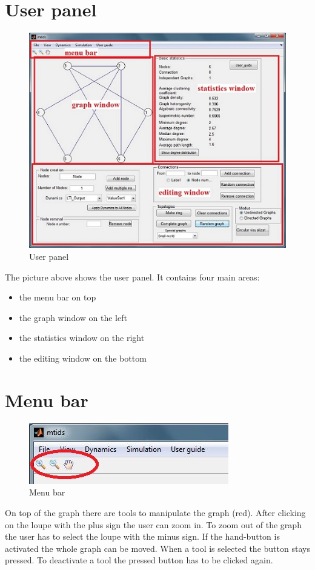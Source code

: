\documentclass[12pt]{report}
\begin{document}
\section{User panel}
\begin{figure}
\centering
\includegraphics[scale=.6]{user_panela3}
\caption{User panel}
\label{FIG:abb6}
\end{figure}
The picture above shows the user panel. It contains four main areas:\\
\begin{itemize}
	\item the menu bar on top
	\item the graph window on the left
	\item the statistics window on the right
	\item the editing window on the bottom
\end{itemize}
\section{Menu bar}
\label{sec:menubar}
\begin{figure}[h]
\centering
\includegraphics[scale=.8]{toolsa}
\caption{Menu bar}
\label{FIG:abb7}
\end{figure}
\noindent On top of the graph there are tools to manipulate the graph (red). After clicking on the loupe with the plus sign the user can zoom in. To zoom out of the graph the user has to select the loupe with the minus sign. If the hand-button is activated the whole graph can be moved. When a tool is selected the button stays pressed. To deactivate a tool the pressed button has to be clicked again.\\
\\
\end{document}
